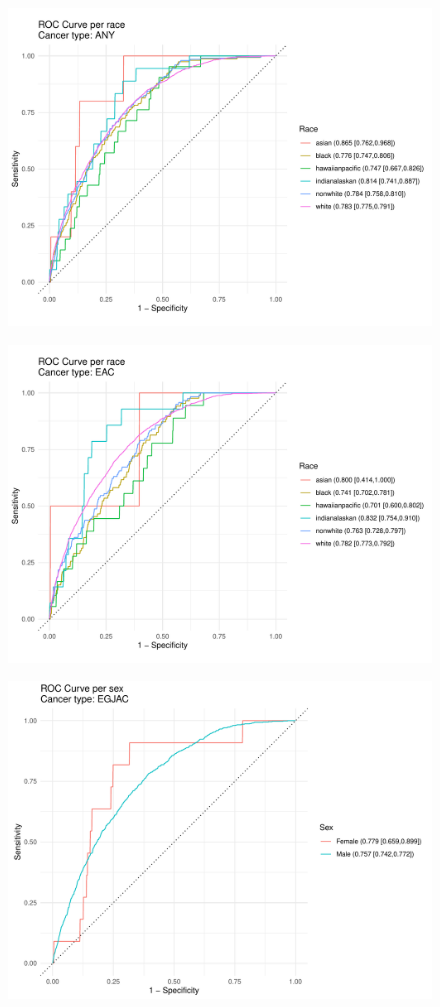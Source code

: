 \documentclass[english]{article}
\begin{document}
\begin{figure}[ht]
\includegraphics[width=1.0\linewidth]{identity/ANY_race.pdf}
\end{figure}
\begin{figure}[ht]
\includegraphics[width=1.0\linewidth]{identity/EAC_race.pdf}
\end{figure}
\begin{figure}[ht]
\includegraphics[width=1.0\linewidth]{identity/EGJAC_sex.pdf}
\end{figure}
\end{document}
